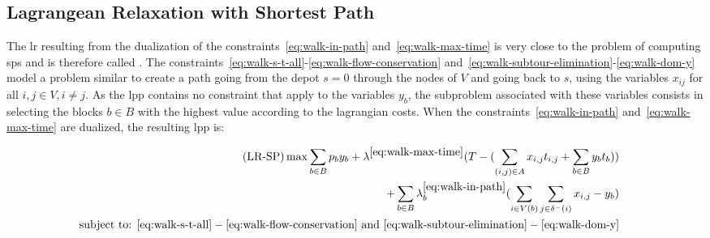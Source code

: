 
\subsection{Lagrangean Relaxation with Shortest Path}\label{sec:lr-sp}

The \gls{lr} resulting from the dualization of the constraints~\eqref{eq:walk-in-path}
and~\eqref{eq:walk-max-time}
is very close to the problem of computing \gls{sp}s and is therefore called {\lrsp}.
The constraints~\eqref{eq:walk-s-t-all}-\eqref{eq:walk-flow-conservation}
and~\eqref{eq:walk-subtour-elimination}-\eqref{eq:walk-dom-y} model a problem similar
to create a path going from the depot $s = 0$ through the nodes of $V$ and going back to $s$,
using the variables $x_{ij}$ for all $i, j \in V, i \neq j$. As the \gls{lpp} contains no
constraint that apply to the variables $y_{b}$, the subproblem associated with these variables
consists in selecting the blocks $b \in B$ with the highest value  according to the lagrangian costs.
When the constraints~\eqref{eq:walk-in-path} and~\eqref{eq:walk-max-time}
are dualized, the resulting \gls{lpp} is:

\begin{align}
	\text{(LR-SP)}                                                                                                                                                \max \sum_{b \in B} p_{b} y_{b} + \lambda^{\ref{eq:walk-max-time}}_{}
	(T - (\sum_{(i,j) \in A} x_{i,j}t_{i,j} + \sum_{b \in B} y_b t_b))                                                                                                & \label{eq:lrsp-of}   \\
	\nonumber                                                                                                                                                     + \sum_{b \in B} \lambda^{\ref{eq:walk-in-path}}_{b}
	(\sum_{i \in V(b)} \sum_{j \in \delta^{-}(i)}x_{i,j} - y_b)                                                                                                   &                    & \\
	\nonumber \text{subject to: } \eqref{eq:walk-s-t-all}-\eqref{eq:walk-flow-conservation}\text{ and } \eqref{eq:walk-subtour-elimination}-\eqref{eq:walk-dom-y} &                    &
\end{align}



